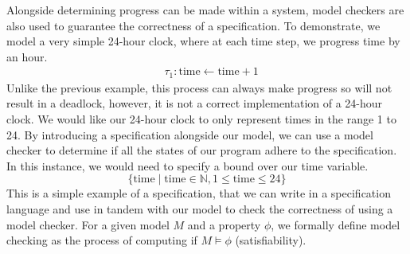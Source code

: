 Alongside determining progress can be made within a system, model checkers are also used to guarantee the correctness of a specification. To demonstrate, we model a very simple 24-hour clock, where at each time step, we progress time by an hour.
\[
\begin{aligned}
& \tau_1: \text{time} \leftarrow \text{time} + 1
\end{aligned}
\]
Unlike the previous example, this process can always make progress so will not result in a deadlock, however, it is not a correct implementation of a 24-hour clock. We would like our 24-hour clock to only represent times in the range 1 to 24. By introducing a specification alongside our model, we can use a model checker to determine if all the states of our program adhere to the specification. In this instance, we would need to specify a bound over our time variable.
\[
\{ \text{time} \mid \text{time} \in \mathbb{N}, 1 \leq \text{time} \leq 24 \}
\]
This is a simple example of a specification, that we can write in a specification language and use in tandem with our model to check the correctness of using a model checker. For a given model $M$ and a property $\phi$, we formally define model checking as the process of computing if $M \models \phi$ (satisfiability).
